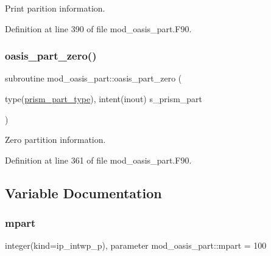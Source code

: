 Print parition information. 



Definition at line 390 of file mod\+\_\+oasis\+\_\+part.\+F90.

\mbox{\label{namespacemod__oasis__part_a17c747bc29d25b558df42524bd63ac90}} 
\subsubsection{\texorpdfstring{oasis\+\_\+part\+\_\+zero()}{oasis\_part\_zero()}}
{\footnotesize\ttfamily subroutine mod\+\_\+oasis\+\_\+part\+::oasis\+\_\+part\+\_\+zero (\begin{DoxyParamCaption}\item[{type(\hyperlink{structmod__oasis__part_1_1prism__part__type}{prism\+\_\+part\+\_\+type}), intent(inout)}]{s\+\_\+prism\+\_\+part }\end{DoxyParamCaption})\hspace{0.3cm}{\ttfamily [private]}}



Zero partition information. 



Definition at line 361 of file mod\+\_\+oasis\+\_\+part.\+F90.



\subsection{Variable Documentation}
\mbox{\label{namespacemod__oasis__part_ab68d087792db0351181c9a97025d793b}} 
\subsubsection{\texorpdfstring{mpart}{mpart}}
{\footnotesize\ttfamily integer(kind=ip\+\_\+intwp\+\_\+p), parameter mod\+\_\+oasis\+\_\+part\+::mpart = 100\hspace{0.3cm}{\ttfamily [private]}}



